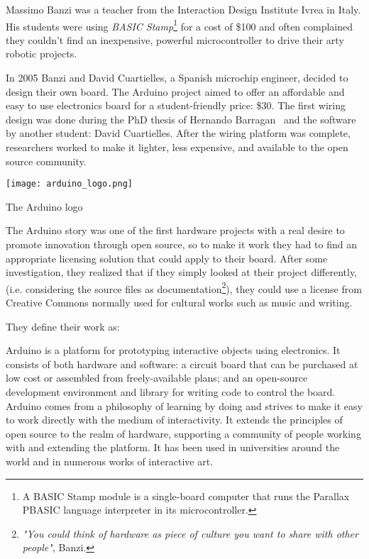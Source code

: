 Massimo Banzi was a teacher from the Interaction Design Institute Ivrea in Italy. His students were using \emph{BASIC Stamp}\footnote{A BASIC Stamp module is a single-board computer that runs the Parallax PBASIC language interpreter in its microcontroller.} for a cost of \$100 and often complained they couldn't find an inexpensive, powerful microcontroller to drive their arty robotic projects.

\begin{row}{4}{2}
    \begin{cell}{3}
      In 2005 Banzi and David Cuartielles, a Spanish microchip engineer, decided to design their own board. The Arduino project aimed to offer an affordable and easy to use electronics board for a student-friendly price: \$30. The first wiring design was done during the PhD thesis of Hernando Barragan~\parencite{barragan2004wiring} and the software by another student: David Cuartielles.
      After the wiring platform was complete, researchers worked to make it lighter, less expensive, and available to the open source community.
    \end{cell}
    \begin{cell}{1}
        \begin{NFfigure}
            \centering
                \texttt{[image: arduino\_logo.png]}
            \caption{The Arduino logo}
            \label{fig:arduino_logo}
        \end{NFfigure}
    \end{cell}
\end{row}

The Arduino story was one of the first hardware projects with a real desire to promote innovation through open source, so to make it work they had to find an appropriate licensing solution that could apply to their board. After some investigation, they realized that if they simply looked at their project differently, (i.e. considering the source files as documentation\footnote{\emph{"You could think of hardware as piece of culture you want to share with other people"}, Banzi. }), they could use a license from Creative Commons normally used for cultural works such as music and writing.

They define their work as:

\begin{formal}
  Arduino is a platform for prototyping interactive objects using electronics. It consists of both hardware and software: a circuit board that can be purchased at low cost or assembled from freely-available plans; and an open-source development environment and library for writing code to control the board. Arduino comes from a philosophy of learning by doing and strives to make it easy to work directly with the medium of interactivity. It extends the principles of open source to the realm of hardware, supporting a community of people working with and extending the platform. It has been used in universities around the world and in numerous works of interactive art.

\end{formal}



